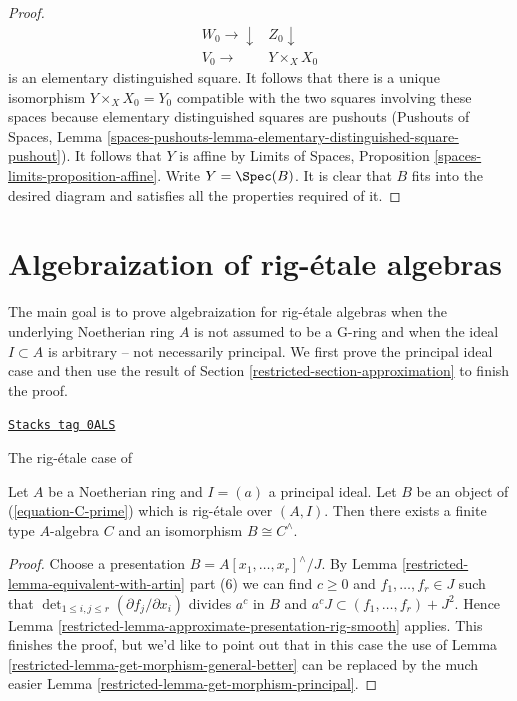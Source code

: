 \begin{proof}
$$
\begin{array}{cc}W_0 \longrightarrow\downarrow & Z_0 \downarrow \\ V_0 \longrightarrow & Y \times_X X_0\end{array}
$$
is an elementary distinguished square. It follows that there is a
unique isomorphism $Y \times_X X_0 = Y_0$ compatible with the two
squares involving these spaces because
elementary distinguished squares are pushouts (Pushouts of Spaces, Lemma
\ref{spaces-pushouts-lemma-elementary-distinguished-square-pushout}).
It follows that $Y$ is affine by
Limits of Spaces, Proposition \ref{spaces-limits-proposition-affine}.
Write $Y = \Spec(B)$. It is clear that $B$ fits into the desired diagram
and satisfies all the properties required of it.
\end{proof}

\section{Algebraization of rig-\'etale algebras}
\label{restricted-section-approximation-principal}
The main goal is to prove algebraization for rig-\'etale algebras
when the underlying Noetherian ring $A$ is not assumed to be a G-ring
and when the ideal $I \subset A$ is arbitrary -- not necessarily principal.
We first prove the principal ideal case and then use the result
of Section \ref{restricted-section-approximation} to finish the proof.

\begin{lemma}
\label{restricted-lemma-approximate-principal}
\href{https://stacks.math.columbia.edu/tag/0ALS}{\texttt{Stacks tag 0ALS}}

\begin{reference}
The rig-\'etale case of \cite[III Theorem 7]{Elkik}
\end{reference}
Let $A$ be a Noetherian ring and $I = (a)$ a principal ideal.
Let $B$ be an object of (\ref{equation-C-prime}) which is
rig-\'etale over $(A, I)$.
Then there exists a finite type $A$-algebra $C$ and an
isomorphism $B \cong C^\wedge$.
\end{lemma}

\begin{proof}

Choose a presentation $B = A[x_1, \ldots, x_r]^\wedge/J$.
By Lemma \ref{restricted-lemma-equivalent-with-artin} part (6) we can find
$c \geq 0$ and $f_1, \ldots, f_r \in J$ such that
$\det_{1 \leq i, j \leq r}(\partial f_j/\partial x_i)$ divides
$a^c$ in $B$ and
$a^c J \subset (f_1, \ldots, f_r) + J^2$.
Hence Lemma \ref{restricted-lemma-approximate-presentation-rig-smooth} applies.
This finishes the proof, but we'd like to point out that in
this case the use of
Lemma \ref{restricted-lemma-get-morphism-general-better}
can be replaced by the much easier
Lemma \ref{restricted-lemma-get-morphism-principal}.
\end{proof}

